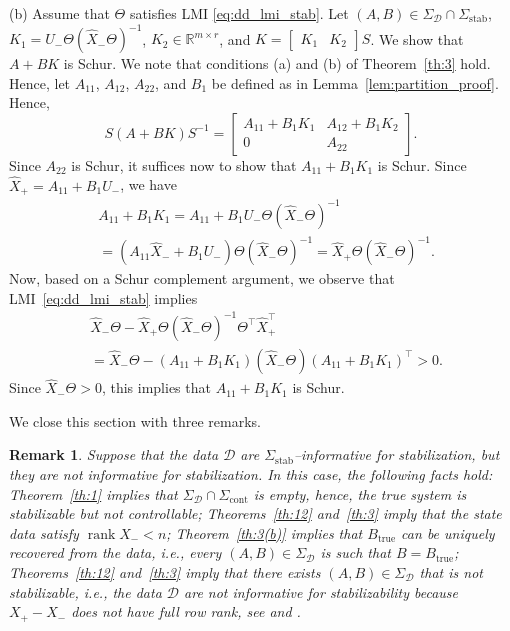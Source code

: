 \documentclass[9pt,shortpaper,twoside,web]{ieeecolor}
\DeclareMathOperator{\rank}{rank}
\newtheorem{remark}[theorem]{Remark}
\begin{document}
(b) Assume that $\Theta$ satisfies LMI \eqref{eq:dd_lmi_stab}. Let \mbox{$(A,B)\in\Sigma_\mathcal{D}\cap\Sigma_\text{stab}$}, $K_1=U_-\Theta(\hat{X}_-\Theta)^{-1}$, $K_2\in\mathbb{R}^{m\times r}$, and $K=\begin{bmatrix}
K_1 & K_2
\end{bmatrix}S$. We show that $A+BK$ is Schur. We note that conditions (a) and (b) of Theorem~\ref{th:3} hold. Hence, let $A_{11}$, $A_{12}$, $A_{22}$, and $B_1$ be defined as in Lemma~\ref{lem:partition_proof}. Hence,
\begin{equation}
S(A+BK)S^{-1}=\begin{bmatrix}
A_{11}+B_1K_1 & A_{12}+B_1K_2 \\
0 & A_{22}
\end{bmatrix}.
\end{equation}
Since $A_{22}$ is Schur, it suffices now to show that \mbox{$A_{11}+B_1K_1$} is Schur. Since $\hat{X}_+=A_{11}+B_1U_-$, we have
\begin{equation}
\begin{split}
&A_{11}+B_1K_1=A_{11}+B_1U_-\Theta(\hat{X}_-\Theta)^{-1}\\
&=(A_{11}\hat{X}_-+B_1U_-)\Theta(\hat{X}_-\Theta)^{-1}=\hat{X}_+\Theta(\hat{X}_-\Theta)^{-1}.
\end{split}
\end{equation} 
Now, based on a Schur complement argument, we observe that LMI~\eqref{eq:dd_lmi_stab} implies
\begin{equation}
\begin{split}
&\hat{X}_-\Theta-\hat{X}_+\Theta(\hat{X}_-\Theta)^{-1}\Theta^\top \hat{X}_+^\top \\
&=\hat{X}_-\Theta-(A_{11}+B_1K_1)(\hat{X}_-\Theta)(A_{11}+B_1K_1)^\top>0.
\end{split}
\end{equation}
Since $\hat{X}_-\Theta>0$, this implies that $A_{11}+B_1K_1$ is Schur. \hfill \QED

We close this section with three remarks.

\begin{remark}
\label{rem:18}
Suppose that the data $\mathcal{D}$ are \mbox{$\Sigma_\text{stab}$--informative} for stabilization, but they are \emph{not} informative for stabilization. In this case, the following facts hold: Theorem~\ref{th:1} implies that $\Sigma_\mathcal{D}\cap\Sigma_\text{cont}$ is empty, hence, the true system is stabilizable but not controllable; Theorems~\ref{th:12} and~\ref{th:3} imply that the state data satisfy $\rank X_-<n$; Theorem~\ref{th:3(b)} implies that $B_\text{true}$ can be uniquely recovered from the data, i.e., every $(A,B)\in\Sigma_\mathcal{D}$ is such that $B=B_\text{true}$; Theorems~\ref{th:12} and~\ref{th:3} imply that there exists $(A,B)\in\Sigma_\mathcal{D}$ that is not stabilizable, i.e., the data $\mathcal{D}$ are not informative for \emph{stabilizability} because $X_+ - X_-$ does not have full row rank, see \cite[Def. 7]{van2020data} and \cite[Thm. 8]{van2020data}.
\end{remark}
\end{document}
